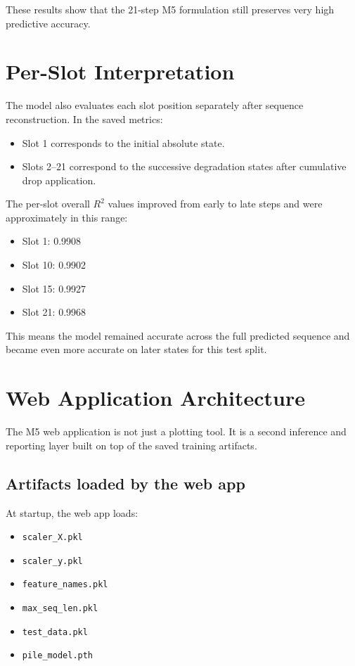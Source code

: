 \documentclass[11pt,a4paper]{article}
\begin{document}
These results show that the 21-step M5 formulation still preserves very high predictive accuracy.

\section{Per-Slot Interpretation}

The model also evaluates each slot position separately after sequence reconstruction. In the saved metrics:

\begin{itemize}[nosep]
    \item Slot 1 corresponds to the initial absolute state.
    \item Slots 2--21 correspond to the successive degradation states after cumulative drop application.
\end{itemize}

The per-slot overall $R^2$ values improved from early to late steps and were approximately in this range:
\begin{itemize}[nosep]
    \item Slot 1: 0.9908
    \item Slot 10: 0.9902
    \item Slot 15: 0.9927
    \item Slot 21: 0.9968
\end{itemize}

This means the model remained accurate across the full predicted sequence and became even more accurate on later states for this test split.

\section{Web Application Architecture}

The M5 web application is not just a plotting tool. It is a second inference and reporting layer built on top of the saved training artifacts.

\subsection*{Artifacts loaded by the web app}
At startup, the web app loads:

\begin{itemize}[nosep]
    \item \texttt{scaler\_X.pkl}
    \item \texttt{scaler\_y.pkl}
    \item \texttt{feature\_names.pkl}
    \item \texttt{max\_seq\_len.pkl}
    \item \texttt{test\_data.pkl}
    \item \texttt{pile\_model.pth}
\end{itemize}
\end{document}

